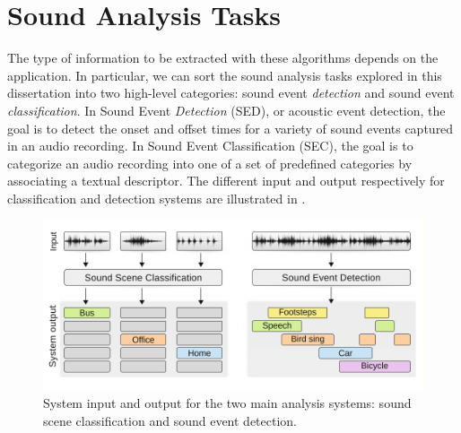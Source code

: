 \section{Sound Analysis Tasks}
The type of information to be extracted with these algorithms depends on the application. In particular, we can sort the sound analysis tasks explored in this dissertation into two high-level categories: sound event \textit{detection} and sound event \textit{classification}.
In Sound Event \textit{Detection} (SED), or acoustic event detection, the goal is to detect the onset and offset times for a variety of sound events captured in an audio recording. 
In Sound Event Classification (SEC), the goal is to categorize an audio recording into one of a set of predefined categories by associating a textual descriptor. The different input and output respectively for classification and detection systems are illustrated in .
\begin{figure}[h]
	\centering
	\includegraphics[width=\linewidth]{img/sed_sec.pdf}
	\caption[System input and output ]{System input and output for the two main analysis systems: sound scene classification and sound event detection.}
	\label{fig:system-io}
\end{figure}

